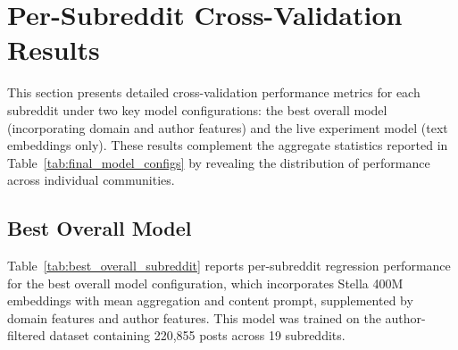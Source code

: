 \section{Per-Subreddit Cross-Validation Results}
\label{app:subreddit_results}

This section presents detailed cross-validation performance metrics for each subreddit under two key model configurations: the best overall model (incorporating domain and author features) and the live experiment model (text embeddings only). These results complement the aggregate statistics reported in Table~\ref{tab:final_model_configs} by revealing the distribution of performance across individual communities.

\subsection{Best Overall Model}

Table~\ref{tab:best_overall_subreddit} reports per-subreddit regression performance for the best overall model configuration, which incorporates Stella 400M embeddings with mean aggregation and content prompt, supplemented by domain features and author features. This model was trained on the author-filtered dataset containing 220,855 posts across 19 subreddits.

